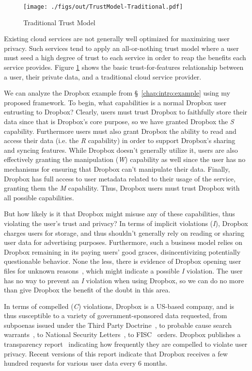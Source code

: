 \begin{figure}[t]
  \centering
  \texttt{[image: ./figs/out/TrustModel-Traditional.pdf]}
  \caption{Traditional Trust Model}
  \label{fig:trust-traditional}
\end{figure}

Existing cloud services are not generally well optimized for
maximizing user privacy. Such services tend to apply an all-or-nothing
trust model where a user must seed a high degree of trust to each
service in order to reap the benefits each service provides. Figure
\ref{fig:trust-traditional} shows the basic trust-for-features
relationship between a user, their private data, and a traditional
cloud service provider.

We can analyze the Dropbox example from \S~\ref{chap:intro:example}
using my proposed framework. To begin, what capabilities is a normal
Dropbox user entrusting to Dropbox? Clearly, users must trust Dropbox
to faithfully store their data since that is Dropbox's core purpose,
so we have granted Dropbox the \emph{S} capability. Furthermore users
must also grant Dropbox the ability to read and access their data
(i.e. the \emph{R} capability) in order to support Dropbox's sharing
and syncing features. While Dropbox doesn't generally utilize it,
users are also effectively granting the manipulation (\emph{W})
capability as well since the user has no mechanisms for ensuring that
Dropbox can't manipulate their data. Finally, Dropbox has full access
to user metadata related to their usage of the service, granting them
the \emph{M} capability. Thus, Dropbox users must trust Dropbox with
all possible capabilities.

But how likely is it that Dropbox might misuse any of these
capabilities, thus violating the user's trust and privacy? In terms of
implicit violations (\emph{I}), Dropbox charges users for storage, and
thus shouldn't generally rely on reading or sharing user data for
advertising purposes. Furthermore, such a business model relies on
Dropbox remaining in its paying users' good graces, disincentivizing
potentially questionable behavior. None the less, there is evidence of
Dropbox opening user files for unknown
reasons~\cite{vintsurf-dropbox}, which might indicate a possible
\emph{I} violation. The user has no way to prevent an \emph{I}
violation when using Dropbox, so we can do no more than give Dropbox
the benefit of the doubt in this area.

In terms of compelled (\emph{C}) violations, Dropbox is a US-based
company, and is thus susceptible to a variety of government-sponsored
data requested, from subpoenas issued under the Third Party
Doctrine~\cite{thompson-thirdparty}, to probable cause search
warrants~\cite{us-constitution-amend4}, to National Security
Letters~\cite{fbi-nsl}, to FISC~\cite{fisc} orders. Dropbox publishes
a transparency report~\cite{dropbox-transparency} indicating how
frequently they are compelled to violate user privacy. Recent versions
of this report indicate that Dropbox receives a few hundred requests
for various user data every 6 months.

